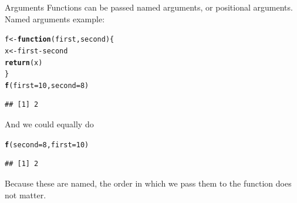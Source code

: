 \documentclass{beamer}\usepackage[]{graphicx}\usepackage[]{color}
\makeatletter
\newcommand{\hlnum}[1]{\textcolor[rgb]{0.686,0.059,0.569}{#1}}%
\newcommand{\hlopt}[1]{\textcolor[rgb]{0,0,0}{#1}}%
\newcommand{\hlstd}[1]{\textcolor[rgb]{0.345,0.345,0.345}{#1}}%
\newcommand{\hlkwa}[1]{\textcolor[rgb]{0.161,0.373,0.58}{\textbf{#1}}}%
\newcommand{\hlkwb}[1]{\textcolor[rgb]{0.69,0.353,0.396}{#1}}%
\newcommand{\hlkwc}[1]{\textcolor[rgb]{0.333,0.667,0.333}{#1}}%
\newcommand{\hlkwd}[1]{\textcolor[rgb]{0.737,0.353,0.396}{\textbf{#1}}}%
\newenvironment{kframe}{%
 \def\at@end@of@kframe{}%
 \ifinner\ifhmode%
  \def\at@end@of@kframe{\end{minipage}}%
  \begin{minipage}{\columnwidth}%
 \fi\fi%
 \def\FrameCommand##1{\hskip\@totalleftmargin \hskip-\fboxsep
 \colorbox{shadecolor}{##1}\hskip-\fboxsep
     \hskip-\linewidth \hskip-\@totalleftmargin \hskip\columnwidth}%
 \MakeFramed {\advance\hsize-\width
   \@totalleftmargin\z@ \linewidth\hsize
   \@setminipage}}%
 {\par\unskip\endMakeFramed%
 \at@end@of@kframe}
\newenvironment{knitrout}{}{} %
\makeatother
\begin{document}
\begin{frame}[fragile]{Arguments}
Functions can be passed named arguments, or positional arguments.
\linebreak
Named arguments example:
\begin{knitrout}
\color{fgcolor}\begin{kframe}
\begin{alltt}
\hlstd{f} \hlkwb{<-} \hlkwa{function}\hlstd{(}\hlkwc{first}\hlstd{,} \hlkwc{second}\hlstd{)\{}
    \hlstd{x}\hlkwb{<-}\hlstd{first} \hlopt{-} \hlstd{second}
    \hlkwd{return}\hlstd{(x)}
\hlstd{\}}
\hlkwd{f}\hlstd{(}\hlkwc{first} \hlstd{=} \hlnum{10}\hlstd{,} \hlkwc{second} \hlstd{=} \hlnum{8}\hlstd{)}
\end{alltt}
\begin{verbatim}
## [1] 2
\end{verbatim}
\end{kframe}
\end{knitrout}
And we could equally do
\begin{knitrout}
\color{fgcolor}\begin{kframe}
\begin{alltt}
\hlkwd{f}\hlstd{(}\hlkwc{second}\hlstd{=}\hlnum{8}\hlstd{,} \hlkwc{first}\hlstd{=}\hlnum{10}\hlstd{)}
\end{alltt}
\begin{verbatim}
## [1] 2
\end{verbatim}
\end{kframe}
\end{knitrout}
Because these are named, the order in which we pass them to the function does not matter.
\end{frame}
\end{document}

